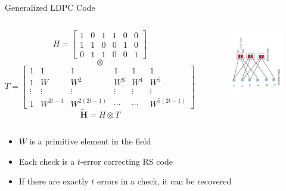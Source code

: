 \documentclass[10pt,xcolor=table]{beamer}
\begin{document}
\begin{frame}{Generalized LDPC Code}

\begin{columns}
    \small
    \[
    H = \left[
    \begin{array}{ccccccc}
    1&0&1&1&0&0\\
    1&1&0&0&1&0 \\
    0&1&1&0&0&1
    \end{array}
    \right]
    \]
    \[
    \otimes
    \]
    \[
    T = \left[
    \begin{array}{ccccccc}
    1&1&1&1&1&1\\
    1&W&W^2&W^3&W^4&W^5 \\
    \vdots & \vdots & \vdots & \vdots & \vdots & \vdots \\
    1&W^{2t-1}&W^{2(2t-1)}&\cdots&\cdots&W^{5(2t-1)}     
    \end{array}
    \right]
    \]
    \[
    \mathbf{\tilde{H}} = H \otimes T
    \]
    \begin{figure}[t]
    \centering
    \includegraphics[width=2.0in,angle=-90]{./Figures/GLDPC}
    \end{figure}
\end{columns}

\begin{itemize}
\item $W$ is a primitive element in the field
\item Each check is a $t$-error correcting RS code
\item If there are exactly $t$ errors in a check, it can be recovered
\end{itemize}

\end{frame}
\end{document}
